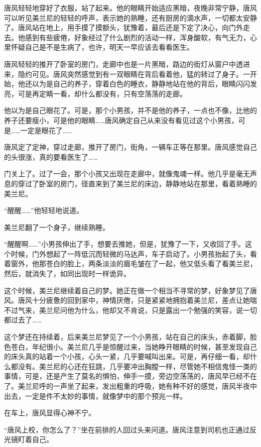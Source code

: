 唐风轻轻地穿好了衣服，站了起来。他的眼睛开始适应黑暗，夜晚非常宁静，唐风可以听见美兰尼的轻轻的呼声，表示她的熟睡，还有厨房的滴水声，一切都太安静了。唐风站在地上，用手摸了摸额头，犹豫着，最后还是下定了决心，向门外走去。他感到有些疲倦，好象经过了什么剧烈的活动一样，浑身酸软，有气无力，心里怀疑自己是不是生病了，也许，明天一早应该去看看医生。 

唐风轻轻的推开了卧室的房门，走廊中也是一片黑暗，路边的街灯从窗户中透进来，隐约可见。唐风突然感觉到有一双眼睛在背后看着他，猛的转过了身子。一开始，他还以为是自己的养子，穿着白色的睡衣，静静地站在他的背后，眼睛闪闪发亮，可是再定睛一看，却什么都没有，只有空荡荡的走廊。 

他以为是自己眼花了。可是，那个小男孩，并不是他的养子，一点也不像，比他的养子还要瘦小，可是他的眼睛……唐风确定自己从来没有看见过这个小男孩，可是……一定是眼花了…… 

唐风定了定神，穿过走廊，推开了房门，街角，一辆车正等在那里。唐风感觉自己的头很涨，真的要看医生了…… 

门关上了。过了一会，那个小孩又出现在走廊中，就像鬼魂一样。他几乎是毫无声息的穿过了卧室的房门，径直来到了美兰尼的床边，静静地站在那里，看着熟睡的美兰尼。 

“醒醒……”他轻轻地说道。 

美兰尼翻了一个身子，继续熟睡。 

“醒醒啊……”小男孩伸出了手，想要去推她，但是，犹豫了一下，又收回了手。这个时候，门外想起了一阵低沉而轻微的马达声，车子启动了。小男孩抬起了头，看着窗外，他那苍白的脸上，两条淡淡的眉毛皱在了一起，他又低头看了看美兰尼，然后，就消失了，如同出现时一样诡异。 

这个时候，美兰尼继续着自己的梦。她正在做一个相当不寻常的梦，好象梦见了唐风。唐风十分疲惫的回到家中，神情厌倦，只是紧紧地拥抱着美兰尼，差点让她喘不过气来，美兰尼问他为什么，他却又不肯说，只是露出一个勉强的笑容，说一切都过去了…… 

这个梦还在持续着，后来美兰尼梦见了一个小男孩，站在自己的床头，赤着脚，脸色苍白，年纪很小。美兰尼几乎是惊醒过来，当她睁开眼睛的时候，甚至发现自己的床头真的站着一个小孩，心头一紧，几乎要喊叫出来。可是，再仔细一看，却什么都没有。美兰尼的心还在狂跳，几乎要冲出胸膛一样，尽管她不相信鬼怪一类的事情，可是，还是产生了莫名的惧怕，伸手一摸，旁边空荡荡的，唐风早已经不在了。美兰尼呼的一声坐了起来，发出粗重的呼吸，她有种不好的感觉，唐风半夜中出去，一定是件不太妙的事情，就像梦中的那个预兆一样。 

在车上，唐风显得心神不宁。 

“唐风上校，你怎么了？”坐在前排的人回过头来问道。唐风注意到司机也正通过反光镜盯着自己。 

